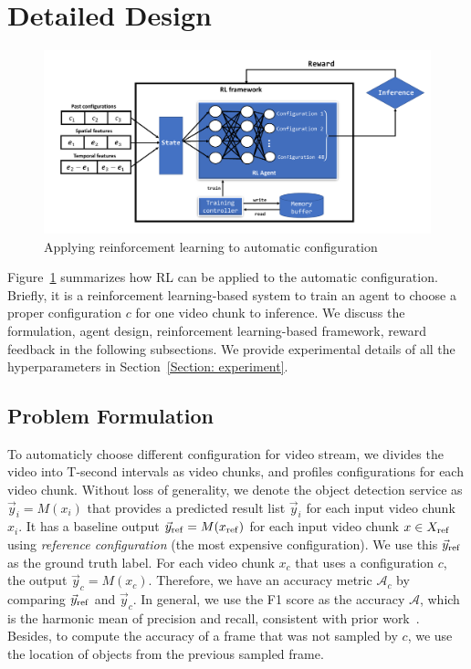 \section{Detailed Design}
\label{Section: design}


\begin{figure}[!t]
	\centerline{\includegraphics[width=0.9\linewidth]{figures/framework2.pdf}}
	\caption{Applying reinforcement learning to automatic configuration}
	\label{fig: DQN}
\end{figure}

Figure~\ref{fig: DQN} summarizes how RL can be applied to the automatic configuration. Briefly, it is a reinforcement learning-based system to train an agent to choose a proper configuration $ c $ for one video chunk to inference. We discuss the formulation, agent design, reinforcement learning-based framework, reward feedback in the following subsections. We provide experimental details of all the hyperparameters in Section~\ref{Section: experiment}. %

\subsection{Problem Formulation}
\label{subsec: formulation}

To automaticly choose different configuration for video stream, we divides the video into T-second intervals as video chunks, and profiles configurations for each video chunk. Without loss of generality, we denote the object detection service as $ \vec{y}_i = M(x_i) $ that provides a predicted result list $ \vec{y}_i $ for each input video chunk $ x_i $. It has a baseline output $ \vec{y}_{\rm ref} = M(x_{\rm ref}) $ for each input video chunk $ x \in X_{\rm ref} $ using \emph{reference configuration} (the most expensive configuration). We use this $ \vec{y}_{\rm ref} $ as the ground truth label. For each video chunk $ x_c $ that uses a configuration $ c $, the output $ \vec{y}_c = M(x_c) $. Therefore, we have an accuracy metric $ \mathcal{A}_c $ by comparing $ \vec{y}_{\rm ref} $ and $ \vec{y}_c $. In general, we use the F1 score as the accuracy $ \mathcal{A} $, which is the harmonic mean of precision and recall, consistent with prior work~\cite{jiang2018chameleon,kang2017f1_noscope,zhang2017f1_live}. Besides, to compute the accuracy of a frame that was not sampled by $ c $, we use the location of objects from the previous sampled frame. 

